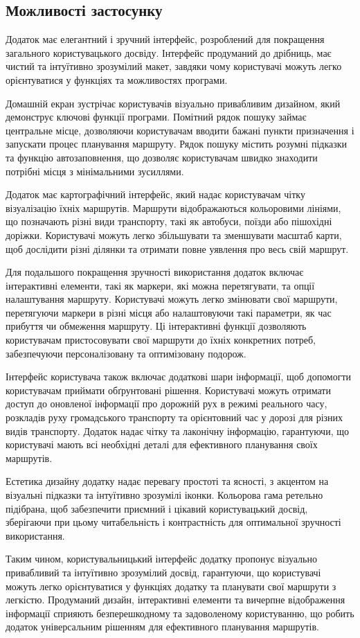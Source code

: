 \subsection{Можливості застосунку}
\label{subsec:features-subsection}

Додаток має елегантний і зручний інтерфейс, розроблений для покращення загального користувацького досвіду. Інтерфейс продуманий до дрібниць, має чистий та інтуїтивно зрозумілий макет, завдяки чому користувачі можуть легко орієнтуватися у функціях та можливостях програми.

Домашній екран зустрічає користувачів візуально привабливим дизайном, який демонструє ключові функції програми. Помітний рядок пошуку займає центральне місце, дозволяючи користувачам вводити бажані пункти призначення і запускати процес планування маршруту. Рядок пошуку містить розумні підказки та функцію автозаповнення, що дозволяє користувачам швидко знаходити потрібні місця з мінімальними зусиллями.

Додаток має картографічний інтерфейс, який надає користувачам чітку візуалізацію їхніх маршрутів. Маршрути відображаються кольоровими лініями, що позначають різні види транспорту, такі як автобуси, поїзди або пішохідні доріжки. Користувачі можуть легко збільшувати та зменшувати масштаб карти, щоб дослідити різні ділянки та отримати повне уявлення про весь свій маршрут.

Для подальшого покращення зручності використання додаток включає інтерактивні елементи, такі як маркери, які можна перетягувати, та опції налаштування маршруту. Користувачі можуть легко змінювати свої маршрути, перетягуючи маркери в різні місця або налаштовуючи такі параметри, як час прибуття чи обмеження маршруту. Ці інтерактивні функції дозволяють користувачам пристосовувати свої маршрути до їхніх конкретних потреб, забезпечуючи персоналізовану та оптимізовану подорож.

Інтерфейс користувача також включає додаткові шари інформації, щоб допомогти користувачам приймати обґрунтовані рішення. Користувачі можуть отримати доступ до оновленої інформації про дорожній рух в режимі реального часу, розкладів руху громадського транспорту та орієнтовний час у дорозі для різних видів транспорту. Додаток надає чітку та лаконічну інформацію, гарантуючи, що користувачі мають всі необхідні деталі для ефективного планування своїх маршрутів.

Естетика дизайну додатку надає перевагу простоті та ясності, з акцентом на візуальні підказки та інтуїтивно зрозумілі іконки. Кольорова гама ретельно підібрана, щоб забезпечити приємний і цікавий користувацький досвід, зберігаючи при цьому читабельність і контрастність для оптимальної зручності використання.

Таким чином, користувальницький інтерфейс додатку пропонує візуально привабливий та інтуїтивно зрозумілий досвід, гарантуючи, що користувачі можуть легко орієнтуватися у функціях додатку та планувати свої маршрути з легкістю. Продуманий дизайн, інтерактивні елементи та вичерпне відображення інформації сприяють безперешкодному та задоволеному користуванню, що робить додаток універсальним рішенням для ефективного планування маршрутів.